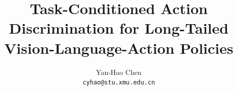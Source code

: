 ﻿\documentclass[11pt]{article}
\title{Task-Conditioned Action Discrimination for Long-Tailed Vision-Language-Action Policies}
\author{
Yan-Hao Chen\\ %
\texttt{cyhao@stu.xmu.edu.cn}
}
\date{}
\begin{document}
\maketitle

\begin{abstract}

\end{abstract}




\FloatBarrier

\FloatBarrier

\FloatBarrier







\appendix

\end{document}
